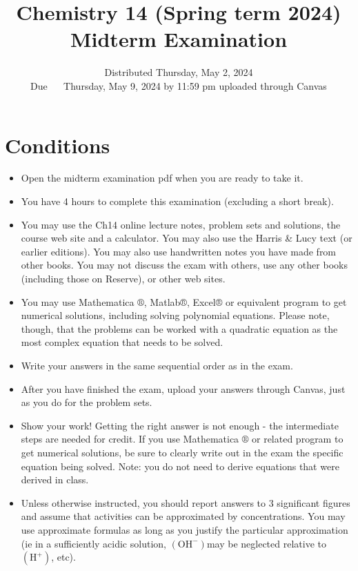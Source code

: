 \documentclass[12pt]{article}
\title{Chemistry 14 (Spring term 2024) \\
 Midterm Examination }
\author{Distributed Thursday, May 2, 2024\\
Due $\quad$ Thursday, May 9, 2024 by 11:59 pm uploaded through Canvas}
\date{}
\begin{document}
\maketitle


\section*{Conditions}
\begin{itemize}
  \item Open the midterm examination pdf when you are ready to take it.

  \item You have 4 hours to complete this examination (excluding a short break).

  \item You may use the Ch14 online lecture notes, problem sets and solutions, the course web site and a calculator. You may also use the Harris \& Lucy text (or earlier editions). You may also use handwritten notes you have made from other books. You may not discuss the exam with others, use any other books (including those on Reserve), or other web sites.

  \item You may use Mathematica $®$, Matlab®, Excel® or equivalent program to get numerical solutions, including solving polynomial equations. Please note, though, that the problems can be worked with a quadratic equation as the most complex equation that needs to be solved.

  \item Write your answers in the same sequential order as in the exam.

  \item After you have finished the exam, upload your answers through Canvas, just as you do for the problem sets.

  \item Show your work! Getting the right answer is not enough - the intermediate steps are needed for credit. If you use Mathematica $\circledR$ or related program to get numerical solutions, be sure to clearly write out in the exam the specific equation being solved. Note: you do not need to derive equations that were derived in class.

  \item Unless otherwise instructed, you should report answers to 3 significant figures and assume that activities can be approximated by concentrations. You may use approximate formulas as long as you justify the particular approximation (ie in a sufficiently acidic solution, $\left(\mathrm{OH}^{-}\right)$may be neglected relative to $\left(\mathrm{H}^{+}\right)$, etc).

\end{itemize}
\end{document}
